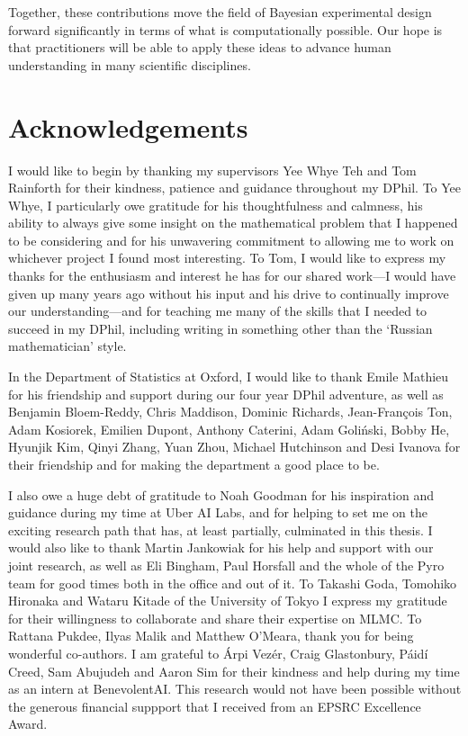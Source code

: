 \documentclass[a4paper, 10pt]{report}
\theoremstyle{plain}
\begin{document}
	Together, these contributions move the field of Bayesian experimental design forward significantly in terms of what is computationally possible. Our hope is that practitioners will be able to apply these ideas to advance human understanding in many scientific disciplines.
	
	\newpage
	\chapter*{Acknowledgements}
	I would like to begin by thanking my supervisors Yee Whye Teh and Tom Rainforth for their kindness, patience and guidance throughout my DPhil.
	To Yee Whye, I particularly owe gratitude for his thoughtfulness and calmness, his ability to always give some insight on the mathematical problem that I happened to be considering and for his unwavering commitment to allowing me to work on whichever project I found most interesting.
	To Tom, I would like to express my thanks for the enthusiasm and interest he has for our shared work---I would have given up many years ago without his input and his drive to continually improve our understanding---and for teaching me many of the skills that I needed to succeed in my DPhil, including writing in something other than the `Russian mathematician' style.
	
	In the Department of Statistics at Oxford, I would like to thank Emile Mathieu for his friendship and support during our four year DPhil adventure, as well as Benjamin Bloem-Reddy, Chris Maddison, Dominic Richards, Jean-François Ton, Adam Kosiorek, Emilien Dupont, Anthony Caterini, Adam Goliński, Bobby He, Hyunjik Kim, Qinyi Zhang, Yuan Zhou, Michael Hutchinson and Desi Ivanova for their friendship and for making the department a good place to be.
	
	I also owe a huge debt of gratitude to Noah Goodman for his inspiration and guidance during my time at Uber AI Labs, and for helping to set me on the exciting research path that has, at least partially, culminated in this thesis.
	I would also like to thank Martin Jankowiak for his help and support with our joint research, as well as Eli Bingham, Paul Horsfall and the whole of the Pyro team for good times both in the office and out of it.
	To Takashi Goda, Tomohiko Hironaka and Wataru Kitade of the University of Tokyo I express my gratitude for their willingness to collaborate and share their expertise on MLMC.
	To Rattana Pukdee, Ilyas Malik and Matthew O'Meara, thank you for being wonderful co-authors.
	I am grateful to Árpi Vezér, Craig Glastonbury, Páidí Creed, Sam Abujudeh and Aaron Sim for their kindness and help during my time as an intern at BenevolentAI.
	This research would not have been possible without the generous financial suppport that I received from an EPSRC Excellence Award.
	
\end{document}

